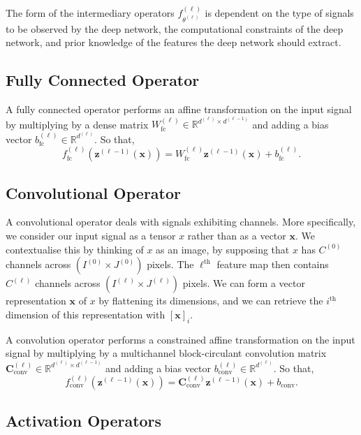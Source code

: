 The form of the intermediary operators $f_{\theta^{(\ell)}}^{(\ell)}$ is dependent on the type of signals to be observed by the deep network, the computational constraints of the deep network, and prior knowledge of the features the deep network should extract.

\subsection{Fully Connected Operator}

A fully connected operator performs an affine transformation on the input signal by multiplying by a dense matrix $W^{(\ell)}_{\text{fc}}\in\mathbb{R}^{d^{(\ell)}\times d^{(\ell-1)}}$ and adding a bias vector $b_{\text{fc}}^{(\ell)}\in\mathbb{R}^{d^{(\ell)}}$. So that, $$f_{\text{fc}}^{(\ell)}\left(\mathbf{z}^{(\ell-1)}(\mathbf{x})\right)=W_{\text{fc}}^{(\ell)}\mathbf{z}^{(\ell-1)}(\mathbf{x})+b_{\text{fc}}^{(\ell)}.$$

\subsection{Convolutional Operator}

A convolutional operator deals with signals exhibiting channels. More specifically, we consider our input signal as a tensor $x$ rather than as a vector $\mathbf{x}$. We contextualise this by thinking of $x$ as an image, by supposing that $x$ has $C^{(0)}$ channels across $\left(I^{(0)}\times J^{(0)}\right)$ pixels. The $\ell^{\text{th}}$ feature map then contains $C^{(\ell)}$ channels across $\left(I^{(\ell)}\times J^{(\ell)}\right)$ pixels. We can form a vector representation $\mathbf{x}$ of $x$ by flattening its dimensions, and we can retrieve the $i^{\text{th}}$ dimension of this representation with $[\mathbf{x}]_i$.

A convolution operator performs a constrained affine transformation on the input signal by multiplying by a multichannel block-circulant convolution matrix $\mathbf{C}_{\text{conv}}^{(\ell)}\in\mathbb{R}^{d^{(\ell)}\times d^{(\ell-1)}}$ and adding a bias vector $b_{\text{conv}}^{(\ell)}\in\mathbb{R}^{d^{(\ell)}}$. So that, $$f^{(\ell)}_{\text{conv}}\left(\mathbf{z}^{(\ell-1)}(\mathbf{x})\right)=\mathbf{C}_{\text{conv}}^{(\ell)}\mathbf{z}^{(\ell-1)}(\mathbf{x})+b_{\text{conv}}.$$

\subsection{Activation Operators}


